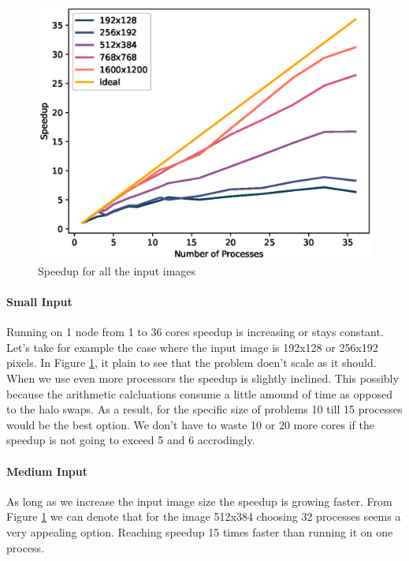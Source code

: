 \documentclass[12pt,a4paper]{article}
\begin{document}
          \begin{figure}[ht]
            \centering
            \includegraphics[scale=0.8]{../graphs/speedup.eps}
            \caption{Speedup for all the input images}
            \label{speedup}
          \end{figure}

          \paragraph{Small Input}
            Running on 1 node from 1 to 36 cores speedup is increasing or stays constant. Let's take for example the case where the input image is 192x128 or 256x192 pixels. In Figure \ref{speedup}, it plain to see that the problem doen't scale as it should. When we use even more processors the speedup is slightly inclined. This possibly because the arithmetic calcluations consume a little amound of time as opposed to the halo swaps. As a result, for the specific size of problems 10 till 15 processes would be the best option. We don't have to waste 10 or 20 more cores if the speedup is not going to exceed 5 and 6 accrodingly.

          \paragraph{Medium Input}
            As long as we increase the input image size the speedup is growing faster. From Figure \ref{speedup} we can denote that for the image 512x384 choosing 32 processes seems a very appealing option. Reaching speedup 15 times faster than running it on one process.
\end{document}
